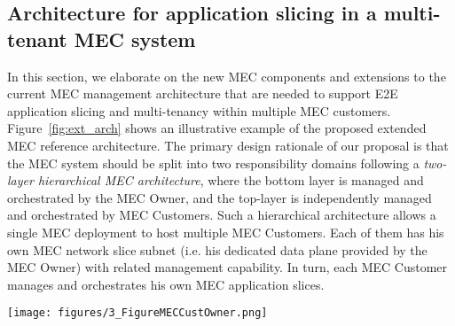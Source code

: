 \subsection{Architecture for application slicing in a multi-tenant MEC system}
\label{subsec:new_MEC_arch}
\noindent
%
In this section, we elaborate on the new MEC components and extensions to the current MEC management architecture that are needed to support E2E application slicing and multi-tenancy within multiple MEC customers. Figure~\ref{fig:ext_arch} shows an illustrative example of the proposed extended MEC reference architecture. The primary design rationale of our proposal is that the MEC system should be split into two responsibility domains following a \textit{two-layer hierarchical MEC architecture}, where the bottom layer is managed and orchestrated by the MEC Owner, and the top-layer is independently managed and orchestrated by MEC Customers. Such a hierarchical architecture allows a single MEC deployment to host multiple MEC Customers. Each of them has his own MEC network slice subnet (i.e. his dedicated data plane provided by the MEC Owner) with related management capability. In turn, each MEC Customer manages and orchestrates his own MEC application slices. 
%
\begin{figure*}[ht]
\centering
\texttt{[image: figures/3\_FigureMECCustOwner.png]}
\caption{Multi-tenant MEC architecture supporting network and application slicing}
\label{fig:ext_arch}
\end{figure*}
%

